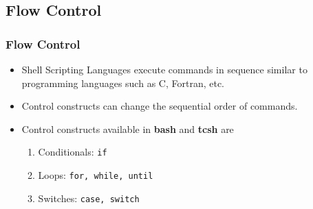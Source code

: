 \documentclass[slidestop,mathserif,compress,xcolor=svgnames]{beamer}
\begin{document}
\subsection{Flow Control}
\begin{frame}
  \frametitle{\small Flow Control}
  \begin{itemize}
    \item Shell Scripting Languages execute commands in sequence similar to programming languages such as C, Fortran, etc.
    \item Control constructs can change the sequential order of commands.
    \item Control constructs available in \textbf{bash} and \textbf{tcsh} are
    \begin{enumerate}
        \item Conditionals: \texttt{if}
        \item Loops: \texttt{for, while, until}
        \item Switches: \texttt{case, switch}
    \end{enumerate}
  \end{itemize}
\end{frame}
\end{document}
